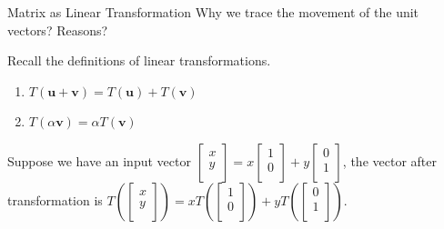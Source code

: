 \documentclass{beamer}
\begin{document}
\begin{frame}{Matrix as Linear Transformation}
Why we trace the movement of the unit vectors? Reasons?

\vspace{3pt}
Recall the definitions of linear transformations.

\vspace{3pt}
\begin{enumerate}
    \item $T\left( \mathbf{u}+\mathbf{v} \right) =T\left( \mathbf{u} \right) +T\left( \mathbf{v} \right)$
    \item $T\left( \alpha \mathbf{v} \right) =\alpha T\left( \mathbf{v} \right) $
\end{enumerate}

\vspace{-3pt}
Suppose we have an input vector $\left[ \begin{array}{c}
	x\\
	y\\
\end{array} \right]=x\left[ \begin{array}{c}
	1\\
	0\\
\end{array} \right]+y\left[ \begin{array}{c}
	0\\
	1\\
\end{array} \right]$, the vector after transformation is $T\left(\left[ \begin{array}{c}
	x\\
	y\\
\end{array}\right]\right)=xT\left(\left[ \begin{array}{c}
	1\\
	0\\
\end{array}\right]\right)+yT\left(\left[ \begin{array}{c}
	0\\
	1\\
\end{array} \right]\right)$.


\end{frame}
\end{document}
